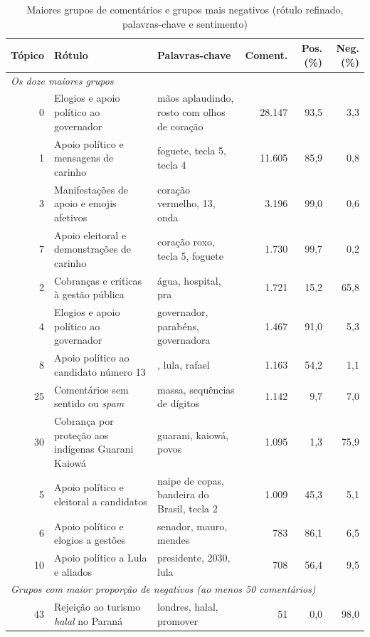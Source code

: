 \begin{table}[htb]
\centering
\caption{Maiores grupos de comentários e grupos mais negativos (rótulo refinado, palavras-chave e sentimento)}
\label{tab:topicos_comentarios}
\scriptsize\setlength{\tabcolsep}{3pt}
\begin{tabular}{r>{\raggedright\arraybackslash}p{5.0cm}>{\raggedright\arraybackslash}p{3.9cm}rrr}
\toprule
\textbf{Tópico} & \textbf{Rótulo} & \textbf{Palavras-chave} & \textbf{Coment.} & \textbf{Pos. (\%)} & \textbf{Neg. (\%)} \\
\midrule
\multicolumn{6}{l}{\emph{Os doze maiores grupos}} \\
0 & Elogios e apoio político ao governador & mãos aplaudindo, rosto com olhos de coração & 28.147 & 93,5 & 3,3 \\
1 & Apoio político e mensagens de carinho & foguete, tecla 5, tecla 4 & 11.605 & 85,9 & 0,8 \\
3 & Manifestações de apoio e emojis afetivos & coração vermelho, 13, onda & 3.196 & 99,0 & 0,6 \\
7 & Apoio eleitoral e demonstrações de carinho & coração roxo, tecla 5, foguete & 1.730 & 99,7 & 0,2 \\
2 & Cobranças e críticas à gestão pública & água, hospital, pra & 1.721 & 15,2 & 65,8 \\
4 & Elogios e apoio político ao governador & governador, parabéns, governadora & 1.467 & 91,0 & 5,3 \\
8 & Apoio político ao candidato número 13 & 13, lula, rafael & 1.163 & 54,2 & 1,1 \\
25 & Comentários sem sentido ou \emph{spam} & massa, sequências de dígitos & 1.142 & 9,7 & 7,0 \\
30 & Cobrança por proteção aos indígenas Guarani Kaiowá & guarani, kaiowá, povos & 1.095 & 1,3 & 75,9 \\
5 & Apoio político e eleitoral a candidatos & naipe de copas, bandeira do Brasil, tecla 2 & 1.009 & 45,3 & 5,1 \\
6 & Apoio político e elogios a gestões & senador, mauro, mendes & 783 & 86,1 & 6,5 \\
10 & Apoio político a Lula e aliados & presidente, 2030, lula & 708 & 56,4 & 9,5 \\
\midrule
\multicolumn{6}{l}{\emph{Grupos com maior proporção de negativos (ao menos 50 comentários)}} \\
43 & Rejeição ao turismo \emph{halal} no Paraná & londres, halal, promover & 51 & 0,0 & 98,0 \\

\end{tabular}
\end{table}
